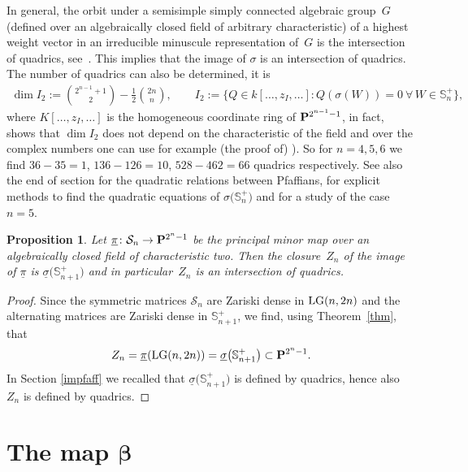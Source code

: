\documentclass[10pt,a4paper]{amsart}
\newcommand{\PP}{{\bf P}}
\newcommand{\bS}{{\mathbb S}}
\newcommand{\cS}{{\cal S}}
\numberwithin{equation}{section}
\newtheorem{Proposition}[Theorem]{Proposition}
{ \theoremstyle{definition}
\newtheorem{Definition}[Theorem]{Definition}
\newtheorem{Example}[Theorem]{Example}
\newtheorem{Examples}[Theorem]{Examples}
\newtheorem{Remark}[Theorem]{Remark} }
\providecommand{\cal}{\mathcal}
\begin{document}
In general, the orbit under a semisimple simply connected algebraic group~$G$ (defined over an algebraically closed field of arbitrary characteristic) of a highest weight vector in an irreducible minuscule representation of~$G$ is the intersection of quadrics, see~\cite{S}. This implies that the image of $\sigma$ is an intersection of quadrics. The number of quadrics can also be determined, it is
\begin{gather*}
\dim I_2 := \binom{2^{n-1}+1}{2} - \frac{1}{2}\binom{2n}{n},\qquad
I_2 := \big\{Q\in k[\ldots,z_I,\ldots]\colon Q(\sigma(W)) = 0\ \forall\, W\in \bS_n^+ \big\},
\end{gather*}
where $K[\ldots,z_I,\ldots]$ is the homogeneous coordinate ring of $\PP^{2^{n-1}-1}$, in fact, \cite{S} shows that $\dim I_2$ does not depend on the characteristic of the field
and over the complex numbers one can use for example (the proof of) \cite[Theorem~2]{vGspin}). So for $n=4,5,6$ we find $36-35=1$, \mbox{$136-126=10$}, $528-462=66$ quadrics respectively. See also the end of section \cite[Section~11.7.2]{P} for the quadratic relations between Pfaffians, \cite{SV} for explicit methods to find the quadratic equations of $\sigma\big(\bS_{n}^+\big)$ and \cite[Section~6]{RS} for a study of the case $n=5$.

\begin{Proposition}\label{quadr} Let $\underline{\pi}\colon \cS_n \rightarrow \PP^{2^n -1}$ be the principal minor map over an algebraically closed field of characteristic two. Then the closure~$Z_n$ of the image of $\underline{\pi}$ is $\underline{\sigma}\big(\bS_{n+1}^+\big)$ and in particular~$Z_n$ is an intersection of quadrics.
\end{Proposition}

\begin{proof} Since the symmetric matrices $\cS_n$ are Zariski dense in ${\rm LG}(n,2n)$ and the alternating matrices are Zariski dense in $\bS_{n+1}^+$, we find, using Theorem~\ref{thm}, that
\begin{gather*}
Z_n = \underline{\pi}({\rm LG}(n,2n)) = \underline{\sigma}\big(\bS_{n+1}^+\big) \subset\PP^{2^n-1}.
\end{gather*}
In Section \ref{impfaff} we recalled that $\underline{\sigma}\big(\bS_{n+1}^+\big)$ is defined by quadrics, hence also $Z_n$ is defined by quadrics.
\end{proof}

\section[The map $\beta$]{The map $\boldsymbol{\beta}$}\label{beta}
\end{document}
